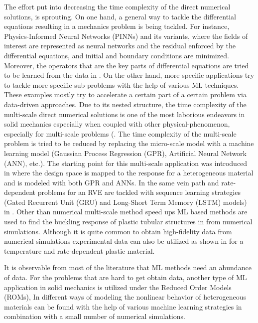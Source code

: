 The effort put into decreasing the time complexity of the direct numerical solutions, is sprouting. On one hand, a general way to tackle the differential equations resulting in a mechanics problem is being tackled. For instance,  Physics-Informed Neural Networks (PINNs) \cite{raissi2019b} and its variants, where the fields of interest are represented as neural networks and the residual enforced by the differential equations, and initial and boundary conditions are minimized.  Moreover, the operators that are the key parts of differential equations are tried to be learned from the data in \cite{lu2021a}. On the other hand, more specific applications try to tackle more specific sub-problems with the help of various ML techniques. These examples mostly try to accelerate a certain part of a certain problem via data-driven approaches. Due to its nested structure, the time complexity of the multi-scale direct numerical solutions is one of the most laborious endeavors in solid mechanics especially when coupled with other physical-phenomenon, especially for multi-scale problems (\eg \cite{Rocha2021,Rocha2020}. The time complexity of the multi-scale problem is tried to be reduced by replacing the micro-scale model with a machine learning model (\eg Gaussian Process Regression (GPR), Artificial Neural Network (ANN), etc.). The starting point for this multi-scale application was introduced in \cite{bessa2017} where the design space is mapped to the response for a heterogeneous material and is modeled with both GPR and ANNs. In the same vein path and rate-dependent problems for an RVE are tackled with sequence learning strategies (\eg Gated Recurrent Unit (GRU) and Long-Short Term Memory (LSTM) models) in \cite{mozaffar2019,chen2021b}. Other than numerical multi-scale method speed ups ML based methods are used to find the buckling response of plastic tubular structures in \cite{sakaridis2022} from numerical simulations. Although it is quite common to obtain high-fidelity data from numerical simulations experimental data can also be utilized as shown in \cite{li2019} for a temperature and rate-dependent plastic material.

It is observable from most of the literature that ML methods need an abundance of data. For the problems that are hard to get obtain data, another type of ML application in solid mechanics is utilized under the Reduced Order Models (ROMs), In \cite{liu2016,ferreira2021,liu2019b} different ways of modeling the nonlinear behavior of heterogeneous materials can be found with the help of various machine learning strategies in combination with a small number of numerical simulations. 

